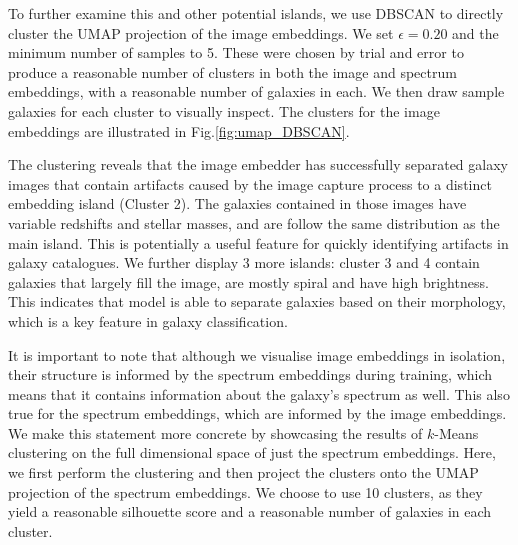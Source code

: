 \documentclass[a4paper,12pt]{article}
\begin{document}
To further examine this and other potential islands, we use DBSCAN to directly cluster the UMAP projection of the image embeddings. We set $\epsilon = 0.20$ and the minimum number of samples to 5. These were chosen by trial and error to produce a reasonable number of clusters in both the image and spectrum embeddings, with a reasonable number of galaxies in each. We then draw sample galaxies for each cluster to visually inspect. The clusters for the image embeddings are illustrated in Fig.\ref{fig:umap_DBSCAN}.

The clustering reveals that the image embedder has successfully separated galaxy images that contain artifacts caused by the image capture process to a distinct embedding island (Cluster 2). The galaxies contained in those images have variable redshifts and stellar masses, and are follow the same distribution as the main island. This is potentially a useful feature for quickly identifying artifacts in galaxy catalogues. We further display 3 more islands: cluster 3 and 4 contain galaxies that largely fill the image, are mostly spiral and have high brightness. This indicates that model is able to separate galaxies based on their morphology, which is a key feature in galaxy classification. 

It is important to note that although we visualise image embeddings in isolation, their structure is informed by the spectrum embeddings during training, which means that it contains information about the galaxy's spectrum as well. This also true for the spectrum embeddings, which are informed by the image embeddings. We make this statement more concrete by showcasing the results of $k$-Means clustering on the full dimensional space of just the spectrum embeddings. Here, we first perform the clustering and then project the clusters onto the UMAP projection of the spectrum embeddings. We choose to use 10 clusters, as they yield a reasonable silhouette score and a reasonable number of galaxies in each cluster. 
\end{document}
